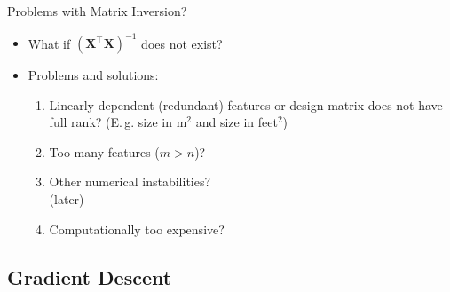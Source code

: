 \begin{frame}{Problems with Matrix Inversion?}{}
	\begin{itemize}
		\item What if $(\bm{X}^{\intercal} \bm{X})^{-1}$ does not exist?
		\item Problems and solutions:
		\begin{enumerate}
			\item Linearly dependent (redundant) features or design matrix does not have full rank? 
				(E.\,g. size in m$^2$ and size in feet$^2$) \\
			\item Too many features ($m > n$)? \\
			\item Other numerical instabilities? \\
				 (later)
			\item Computationally too expensive? \\
		\end{enumerate}
	\end{itemize}
\end{frame}


\subsection{Gradient Descent}

